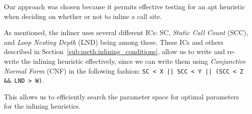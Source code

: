 Our approach was chosen because it permits effective testing for an apt
heuristic when deciding on whether or not to inline a call site.

As mentioned, the inliner uses several different ICs: SC, \textit{Static Call
Count} (SCC), and \textit{Loop Nesting Depth} (LND) being among these. These ICs
and others described in Section~\ref{sub:meth:inlining_conditions}, allow us to
write and re-write the inlining heuristic effectively, since we can write them
using \textit{Conjunctive Normal Form} (CNF) in the following fashion:
\lstinline"SC < X || SCC < Y || (SCC < Z && LND > W)".

This allows us to efficiently search the parameter space for optimal parameters
for the inlining heuristics.


